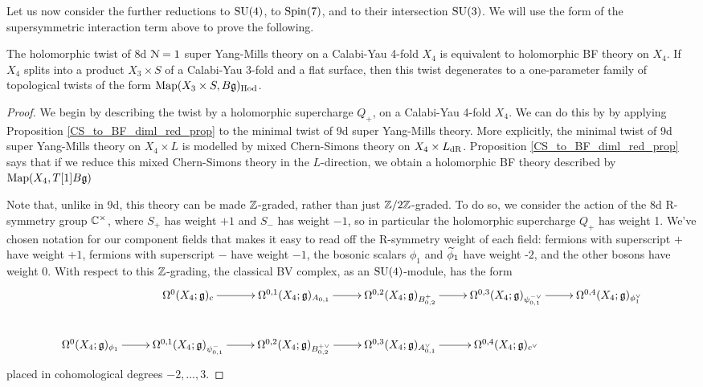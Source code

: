 \documentclass[10pt, oneside]{article}
\begin{document}
Let us now consider the further reductions to $\mathrm{SU}(4)$, to $\mathrm{Spin}(7)$, and to their intersection $\mathrm{SU}(3)$.  We will use the form of the supersymmetric interaction term above to prove the following.

\begin{theorem} \label{8d_holo_twist_thm}
The holomorphic twist of 8d $\mathcal{N}=1$ super Yang-Mills theory on a Calabi-Yau 4-fold $X_4$ is equivalent to holomorphic BF theory on $X_4$. If $X_4$ splits into a product $X_3 \times S$ of a Calabi-Yau 3-fold and a flat surface, then this twist degenerates to a one-parameter family of topological twists of the form $\operatorname{Map}(X_3 \times S, B\mathfrak{g})_{\mathrm{Hod}}$.
\end{theorem}

\begin{proof}
We begin by describing the twist by a holomorphic supercharge $Q_+$, on a Calabi-Yau 4-fold $X_4$.  We can do this by by applying Proposition \ref{CS_to_BF_diml_red_prop} to the minimal twist of 9d super Yang-Mills theory.  More explicitly, the minimal twist of 9d super Yang-Mills theory on $X_4 \times L$ is modelled by mixed Chern-Simons theory on $X_4 \times L_{\mathrm{dR}}$. Proposition \ref{CS_to_BF_diml_red_prop} says that if we reduce this mixed Chern-Simons theory in the $L$-direction, we obtain a holomorphic BF theory described by $\operatorname{Map}(X_4, T[1]B\mathfrak{g})$

Note that, unlike in 9d, this theory can be made $\mathbb Z$-graded, rather than just $\mathbb Z/2\mathbb Z$-graded.  To do so, we consider the action of the 8d R-symmetry group $\mathbb C^\times$, where $S_+$ has weight $+1$ and $S_-$ has weight $-1$, so in particular the holomorphic supercharge $Q_+$ has weight 1.  We've chosen notation for our component fields that makes it easy to read off the R-symmetry weight of each field: fermions with superscript $+$ have weight $+1$, fermions with superscript $-$ have weight $-1$, the bosonic scalars $\phi_1$ and $\widetilde{\phi}_1$ have weight -$2$, and the other bosons have weight 0.  With respect to this $\mathbb Z$-grading, the classical BV complex, as an $\mathrm{SU}(4)$-module, has the form
\[\xymatrix{&\Omega^0(X_4; \gg)_c \ar[r] &\Omega^{0,1}(X_4; \gg)_{A_{0,1}} \ar[r] &\Omega^{0,2}(X_4; \gg)_{B^+_{0,2}} \ar[r] &\Omega^{0,3}(X_4; \gg)_{\psi_{0,1}^{-\vee}} \ar[r] &\Omega^{0,4}(X_4; \gg)_{\phi_1^\vee} \\
\Omega^0(X_4; \gg)_{\phi_1} \ar[r] &\Omega^{0,1}(X_4; \gg)_{\psi_{0,1}^{-}} \ar[r] &\Omega^{0,2}(X_4; \gg)_{B^{+\vee}_{0,2}} \ar[r] &\Omega^{0,3}(X_4; \gg)_{A_{0,1}^\vee} \ar[r] &\Omega^{0,4}(X_4; \gg)_{c^\vee}&
}\]
placed in cohomological degrees $-2, \ldots, 3$.


\end{proof}
\end{document}
